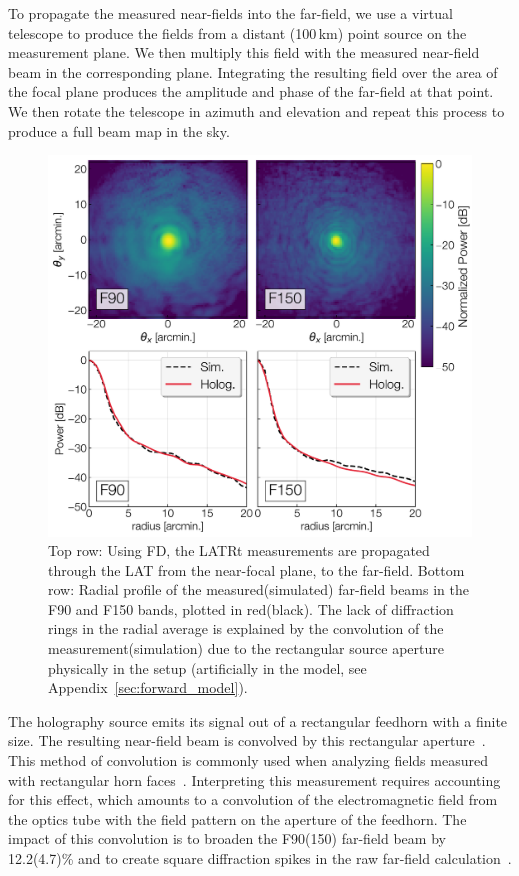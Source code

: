 To propagate the measured near-fields into the far-field, we use a virtual telescope to produce the fields from a distant (100\,km) point source on the measurement plane.  We then multiply this field with the measured near-field beam in the corresponding plane.  Integrating the resulting field over the area of the focal plane produces the amplitude and phase of the far-field at that point.  We then rotate the telescope in azimuth and elevation and repeat this process to produce a full beam map in the sky.

\begin{figure}[ht!]
    \centering
    \includegraphics[width = .9\textwidth]{Figures/MF_ff.pdf}
    \caption{Top row: Using FD, the LATRt measurements are propagated through the LAT from the near-focal plane, to the far-field.  Bottom row: Radial profile of the measured(simulated) far-field beams in the F90 and F150 bands, plotted in red(black).  The lack of diffraction rings in the radial average is explained by the convolution of the measurement(simulation) due to the rectangular source aperture physically in the setup (artificially in the model, see Appendix~\ref{sec:forward_model}).}
    \label{fig:farfields}
\end{figure}

The holography source emits its signal out of a rectangular feedhorn with a finite size.  The resulting near-field beam is convolved by this rectangular aperture~\cite{Goodman2005-ne}.  This method of convolution is commonly used when analyzing fields measured with rectangular horn faces~\cite{1141856,Karimipour2019ShapingEW}.  Interpreting this measurement requires accounting for this effect, which amounts to a convolution of the electromagnetic field from the optics tube with the field pattern on the aperture of the feedhorn.  The impact of this convolution is to broaden the F90(150) far-field beam by 12.2(4.7)\% and to create square diffraction spikes in the raw far-field calculation~\cite{Goodman2005-ne}.

